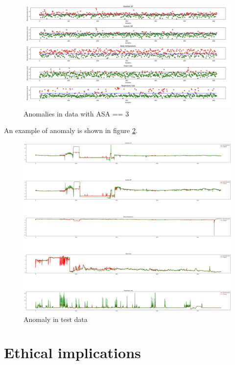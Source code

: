 \documentclass{article}
\begin{document}
\begin{multicols*}{2}
\begin{figure}[H]
	\centering
	\includegraphics[width=\linewidth]{imgs/feature_asa3_err.png}
	\caption{Anomalies in data with ASA == 3}
	\label{fig:feature_asa3_data}
\end{figure}


An example of anomaly is shown in figure \ref{fig:anomaly}.


\begin{figure}[H]
	\centering
	\includegraphics[width=\linewidth]{imgs/test_anomaly.png} 
	\caption{Anomaly in test data}
	\label{fig:anomaly}
\end{figure}



\section{Ethical implications}
		\label{ethics}


\end{multicols*}
\end{document}
